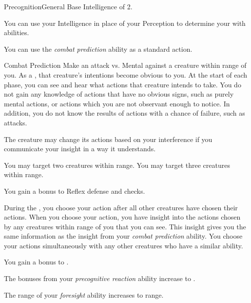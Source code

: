     \begin{feat}{Precognition}{General}
        \featpre Base Intelligence of 2.

         You can use your Intelligence in place of your Perception to determine your  with  abilities.

         You can use the \textit{combat prediction} ability as a standard action.
        \begin{freeability}{Combat Prediction}
            Make an attack vs. Mental against a creature within \rngmed range of you.
            \hit As a , that creature's intentions become obvious to you.
            At the start of each phase, you can see and hear what actions that creature intends to take.
            You do not gain any knowledge of actions that have no obvious signs, such as purely mental actions, or actions which you are not observant enough to notice.
            In addition, you do not know the results of actions with a chance of failure, such as attacks.

            The creature may change its actions based on your interference if you communicate your insight in a way it understands.

            \rankline
             You may target two creatures within range.
             You may target three creatures within range.
        \end{freeability}

         You gain a  bonus to Reflex defense and  checks.

         During the , you choose your action after all other creatures have chosen their actions.
        When you choose your action, you have insight into the actions chosen by any creatures within \rngclose range of you that you can see.
        This insight gives you the same information as the insight from your \textit{combat prediction} ability.
        You choose your actions simultaneously with any other creatures who have a similar ability.

         You gain a  bonus to .

         The bonuses from your \textit{precognitive reaction} ability increase to .

         The range of your \textit{foresight} ability increases to \rnglong range.
    \end{feat}

